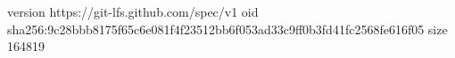 version https://git-lfs.github.com/spec/v1
oid sha256:9c28bbb8175f65c6e081f4f23512bb6f053ad33c9ff0b3fd41fc2568fe616f05
size 164819
